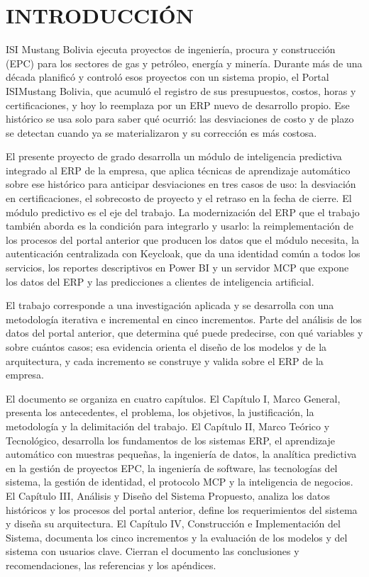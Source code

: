 \section*{INTRODUCCIÓN}

ISI Mustang Bolivia ejecuta proyectos de ingeniería, procura y construcción (EPC) para los sectores de gas y petróleo, energía y minería. Durante más de una década planificó y controló esos proyectos con un sistema propio, el Portal ISIMustang Bolivia, que acumuló el registro de sus presupuestos, costos, horas y certificaciones, y hoy lo reemplaza por un ERP nuevo de desarrollo propio. Ese histórico se usa solo para saber qué ocurrió: las desviaciones de costo y de plazo se detectan cuando ya se materializaron y su corrección es más costosa.

El presente proyecto de grado desarrolla un módulo de inteligencia predictiva integrado al ERP de la empresa, que aplica técnicas de aprendizaje automático sobre ese histórico para anticipar desviaciones en tres casos de uso: la desviación en certificaciones, el sobrecosto de proyecto y el retraso en la fecha de cierre. El módulo predictivo es el eje del trabajo. La modernización del ERP que el trabajo también aborda es la condición para integrarlo y usarlo: la reimplementación de los procesos del portal anterior que producen los datos que el módulo necesita, la autenticación centralizada con Keycloak, que da una identidad común a todos los servicios, los reportes descriptivos en Power BI y un servidor MCP que expone los datos del ERP y las predicciones a clientes de inteligencia artificial.

El trabajo corresponde a una investigación aplicada y se desarrolla con una metodología iterativa e incremental en cinco incrementos. Parte del análisis de los datos del portal anterior, que determina qué puede predecirse, con qué variables y sobre cuántos casos; esa evidencia orienta el diseño de los modelos y de la arquitectura, y cada incremento se construye y valida sobre el ERP de la empresa.

El documento se organiza en cuatro capítulos. El Capítulo I, Marco General, presenta los antecedentes, el problema, los objetivos, la justificación, la metodología y la delimitación del trabajo. El Capítulo II, Marco Teórico y Tecnológico, desarrolla los fundamentos de los sistemas ERP, el aprendizaje automático con muestras pequeñas, la ingeniería de datos, la analítica predictiva en la gestión de proyectos EPC, la ingeniería de software, las tecnologías del sistema, la gestión de identidad, el protocolo MCP y la inteligencia de negocios. El Capítulo III, Análisis y Diseño del Sistema Propuesto, analiza los datos históricos y los procesos del portal anterior, define los requerimientos del sistema y diseña su arquitectura. El Capítulo IV, Construcción e Implementación del Sistema, documenta los cinco incrementos y la evaluación de los modelos y del sistema con usuarios clave. Cierran el documento las conclusiones y recomendaciones, las referencias y los apéndices.
